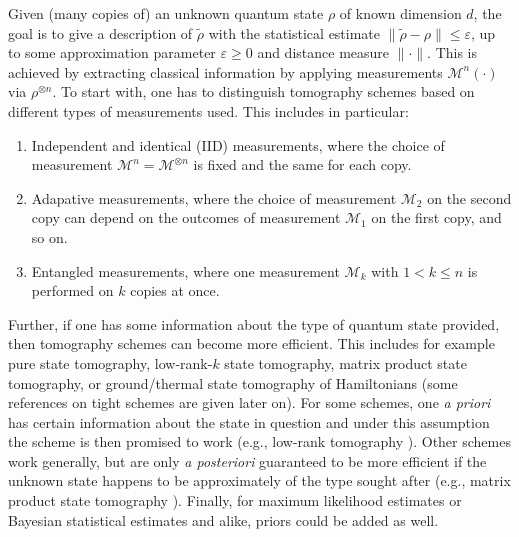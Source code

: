 \begin{refsection}
Given (many copies of) an unknown quantum state $\rho$ of known dimension $d$, the goal is to give a description of $\tilde{\rho}$ with the statistical estimate $\|\tilde{\rho}-\rho\|\leq\varepsilon$, up to some approximation parameter $\varepsilon\geq0$ and distance measure $\|\cdot\|$. This is achieved by extracting classical information by applying measurements $\mathcal{M}^n(\cdot)$ via $\rho^{\otimes n}$. To start with, one has to distinguish tomography schemes based on different types of measurements used. This includes in particular:
\begin{enumerate}
    \item Independent and identical (IID) measurements, where the choice of measurement $\mathcal{M}^n=\mathcal{M}^{\otimes n}$ is fixed and the same for each copy.
    \item Adapative measurements, where the choice of measurement $\mathcal{M}_2$ on the second copy can depend on the outcomes of measurement $\mathcal{M}_1$ on the first copy, and so on.
    \item Entangled measurements, where one measurement $\mathcal{M}_k$ with $1<k\leq n$ is performed on $k$ copies at once.
\end{enumerate}
Further, if one has some information about the type of quantum state provided, then tomography schemes can become more efficient. This includes for example pure state tomography, low-rank-$k$ state tomography, matrix product state tomography, or ground/thermal state tomography of Hamiltonians (some references on tight schemes are given later on). For some schemes, one \textit{a priori} has certain information about the state in question and under this assumption the scheme is then promised to work (e.g., low-rank tomography \cite{haah2017OptTomography}). Other schemes work generally, but are only \textit{a posteriori} guaranteed to be more efficient if the unknown state happens to be approximately of the type sought after (e.g., matrix product state tomography \cite{cramer2010mpstomography}). Finally, for maximum likelihood estimates or Bayesian statistical estimates and alike, priors could be added as well.


\end{refsection}

